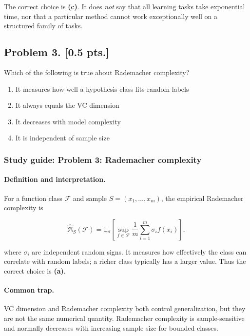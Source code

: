 \documentclass[11pt,a4paper]{article}
\begin{document}
The correct choice is \textbf{(c)}. It does \emph{not} say that all learning tasks take exponential time, nor that a particular method cannot work exceptionally well on a structured family of tasks.



\subsection{Problem 3. [0.5 pts.]}
Which of the following is true about Rademacher complexity?
\begin{enumerate}[label=(\alph*)]
    \item It measures how well a hypothesis class fits random labels
    \item It always equals the VC dimension
    \item It decreases with model complexity
    \item It is independent of sample size
\end{enumerate}


\subsubsection{Study guide: Problem 3: Rademacher complexity}

\paragraph{Definition and interpretation.}

For a function class $\mathcal{F}$ and sample $S=(x_1,\ldots,x_m)$, the empirical Rademacher complexity is

\[
\widehat{\mathfrak{R}}_S(\mathcal{F})
= \mathbb{E}_{\sigma}
\left[
\sup_{f\in\mathcal{F}}
\frac{1}{m}\sum_{i=1}^m \sigma_i f(x_i)
\right],
\]

where $\sigma_i$ are independent random signs. It measures how effectively the class can correlate with random labels; a richer class typically has a larger value. Thus the correct choice is \textbf{(a)}.

\paragraph{Common trap.}

VC dimension and Rademacher complexity both control generalization, but they are not the same numerical quantity. Rademacher complexity is sample-sensitive and normally decreases with increasing sample size for bounded classes.
\end{document}
